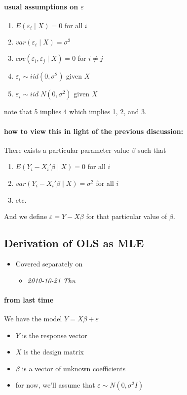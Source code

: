 \paragraph{usual assumptions on $\varepsilon$}
\begin{enumerate}
\item $E(\varepsilon_i \mid X) = 0$ for all $i$
\item $var(\varepsilon_i \mid X) = \sigma^2$
\item $cov(\varepsilon_i, \varepsilon_j \mid X) = 0$ for $i \neq j$
\item $\varepsilon_i \sim iid(0,\sigma^2)$ given $X$
\item $\varepsilon_i \sim iid\; N(0,\sigma^2)$ given $X$
\end{enumerate}
      note that 5 implies 4 which implies 1, 2, and 3.

\paragraph{how to view this in light of the previous discussion:}
There exists a particular parameter value $\beta$ such that
\begin{enumerate}
\item $E(Y_i - X_i'\beta \mid X) = 0$ for all $i$
\item $var(Y_i - X_i'\beta \mid X) = \sigma^2$ for all $i$
\item etc.
\end{enumerate}
And we define $\varepsilon = Y - X\beta$ for that particular value of
$\beta$.

\subsection{Derivation of OLS as MLE}

\begin{itemize}
\item Covered separately on
\begin{itemize}
\item \textit{2010-10-21 Thu}
\end{itemize}
\end{itemize}

\paragraph{from last time}
      We have the model $Y = X\beta + \varepsilon$
\begin{itemize}
\item $Y$ is the response vector
\item $X$ is the design matrix
\item $\beta$ is a vector of unknown coefficients
\item for now, we'll assume that $\varepsilon \sim N(0,\sigma^2 I)$
\end{itemize}

